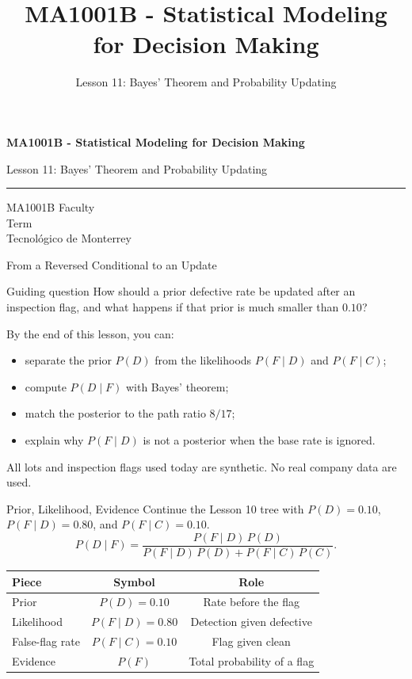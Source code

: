 \documentclass[aspectratio=169,10pt,english]{beamer}
\title{MA1001B - Statistical Modeling for Decision Making}
\subtitle{Lesson 11: Bayes' Theorem and Probability Updating}
\author{}
\institute{Tecnol\'ogico de Monterrey}
\date{}
\begin{document}
\begin{frame}[plain]
  \vspace{1.2cm}
  {\Large\bfseries MA1001B - Statistical Modeling for Decision Making\par}
  \vspace{0.7cm}
  {\large Lesson 11: Bayes' Theorem and Probability Updating\par}
  \vspace{0.7cm}
  {\color{TecRojo}\rule{\textwidth}{1.2pt}}
  \vspace{0.8cm}

  MA1001B Faculty\\[0.3cm]
  Term\\[0.3cm]
  Tecnol\'ogico de Monterrey
\end{frame}

\begin{frame}{From a Reversed Conditional to an Update}
  \begin{alertblock}{Guiding question}
    How should a prior defective rate be updated after an inspection flag,
    and what happens if that prior is much smaller than $0.10$?
  \end{alertblock}

  \vspace{0.6em}
  By the end of this lesson, you can:
  \begin{itemize}
    \item separate the prior $P(D)$ from the likelihoods $P(F\mid D)$ and $P(F\mid C)$;
    \item compute $P(D\mid F)$ with Bayes' theorem;
    \item match the posterior to the path ratio $8/17$;
    \item explain why $P(F\mid D)$ is not a posterior when the base rate is ignored.
  \end{itemize}

  \vfill
  \scriptsize All lots and inspection flags used today are synthetic. No real company data are used.
\end{frame}

\begin{frame}{Prior, Likelihood, Evidence}
  \small
  Continue the Lesson 10 tree with $P(D)=0.10$, $P(F\mid D)=0.80$, and
  $P(F\mid C)=0.10$.
  \[
    P(D\mid F)=\frac{P(F\mid D)\,P(D)}{P(F\mid D)\,P(D)+P(F\mid C)\,P(C)}.
  \]

  \vspace{0.4em}
  \begin{center}
    \begin{tabular}{lcc}
      \toprule
      \textbf{Piece} & \textbf{Symbol} & \textbf{Role} \\
      \midrule
      Prior & $P(D)=0.10$ & Rate before the flag \\
      Likelihood & $P(F\mid D)=0.80$ & Detection given defective \\
      False-flag rate & $P(F\mid C)=0.10$ & Flag given clean \\
      Evidence & $P(F)$ & Total probability of a flag \\
      \bottomrule
    \end{tabular}
  \end{center}
\end{frame}
\end{document}
